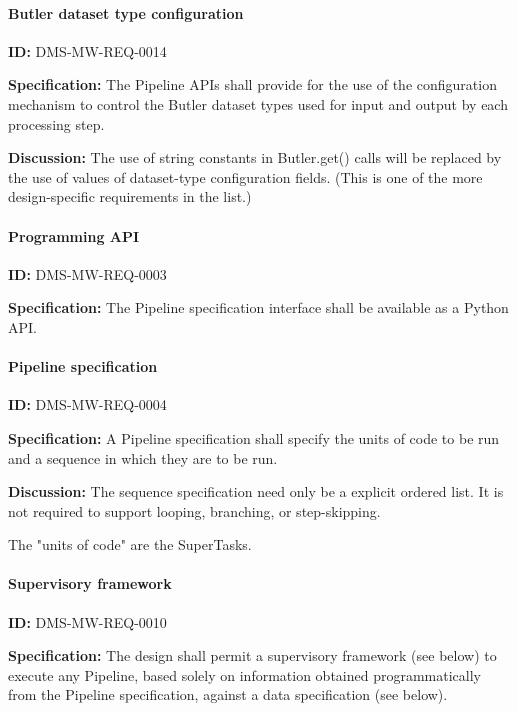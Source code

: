 \documentclass[SE,toc,lsstdraft]{lsstdoc}
\begin{document}
\paragraph{Butler dataset type configuration}\hfill  %

\label{DMS-MW-REQ-0014}
\textbf{ID:} DMS-MW-REQ-0014

\textbf{Specification:}
The Pipeline APIs shall provide for the use of the configuration mechanism to control the Butler dataset types used for input and output by each processing step.

\textbf{Discussion:}
The use of string constants in Butler.get() calls will be replaced by the use of values of dataset-type configuration fields. (This is one of the more design-specific requirements in the list.)

\paragraph{Programming API}\hfill  %

\label{DMS-MW-REQ-0003}
\textbf{ID:} DMS-MW-REQ-0003

\textbf{Specification:}
The Pipeline specification interface shall be available as a Python API.

\paragraph{Pipeline specification}\hfill  %

\label{DMS-MW-REQ-0004}
\textbf{ID:} DMS-MW-REQ-0004

\textbf{Specification:}
A Pipeline specification shall specify the units of code to be run and a sequence in which they are to be run.

\textbf{Discussion:}
The sequence specification need only be a explicit ordered list.  It is not required to support looping, branching, or step-skipping.

The "units of code" are the SuperTasks.

\paragraph{Supervisory framework}\hfill  %

\label{DMS-MW-REQ-0010}
\textbf{ID:} DMS-MW-REQ-0010

\textbf{Specification:}
The design shall permit a supervisory framework (see below) to execute any Pipeline, based solely on information obtained programmatically from the Pipeline specification, against a data specification (see below).
\end{document}
